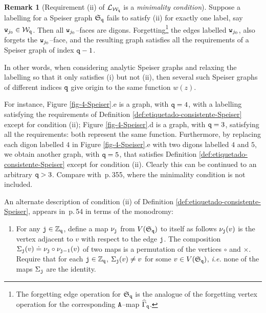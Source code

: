 \documentclass[final,3p,times]{elsarticle}
\newcommand{\ZZ}{\ensuremath{{\mathbb Z}}}
\theoremstyle{definition}
\newtheorem{remark}[theorem]{Remark}
\begin{document}
\begin{remark}[Requirement (ii) of $\mathcal{L}_{\mathcal{W}_{\tt q}}$ 
is a \emph{minimality condition}]
\label{rem:minimality-condition}
Suppose a labelling for a Speiser graph $\mathfrak{S}_{\tt q}$ fails to
satisfy (ii) 
for exactly one label, say ${\tt w}_{j_0}\in\mathcal{W}_{\tt q}$. 
Then all  
${\tt w}_{j_0}$--faces are digons.
Forgetting\footnote{
The forgetting edge operation for $\mathfrak{S}_{\tt q}$ is the analogue of the forgetting vertex operation
for the corresponding $\tt A$--map $\widehat{\Gamma}_{\tt q}$.
} 
the edges labelled ${\tt w}_{j_0}$, also forgets the 
${\tt w}_{j_0}$--face, and the resulting graph satisfies all the requirements of a Speiser graph
of index ${\tt q}-1$.

\noindent
In other words, when considering analytic Speiser graphs and relaxing the labelling 
so that it only satisfies (i) but not (ii), then several such Speiser graphs of 
different indices $\tt q$
give origin to the same function $w(z)$. 

\noindent
For instance, Figure \ref{fig-4-Speiser}.e is a graph, with ${\tt q}=4$, with a labelling 
satisfying the requirements of 
Definition \ref{def:etiquetado-consistente-Speiser} except for condition (ii); 
Figure \ref{fig-4-Speiser}.d is a graph, with ${\tt q}=3$, satisfying all the requirements: 
both represent the same
function. Furthermore, by replacing each digon labelled $4$ in Figure \ref{fig-4-Speiser}.e
with two digons labelled $4$ and $5$, we obtain another graph, with ${\tt q}=5$, that satisfies 
Definition \ref{def:etiquetado-consistente-Speiser} except for condition (ii).
Clearly this can be continued to an arbitrary ${\tt q}>3$.
Compare with \cite{GoldbergOstrovskii}\,p.\,355, where 
the minimality condition is not included.

\smallskip
\noindent
An alternate description of condition (ii) of Definition \ref{def:etiquetado-consistente-Speiser},
appears in \cite{Masoero}\,p.\,54 in terms of the monodromy:

\smallskip 

\begin{enumerate}[label=ii$^\prime$),leftmargin=*]
\item
For any ${\tt j}\in\ZZ_{\tt q}$,  define a map 
$\nu_{\tt j}$
from 
$V(\mathfrak{S}_{\tt q})$ to itself as follows
$\nu_{\tt j}(v)$ is the vertex adjacent to $v$ 
with respect to the edge ${\tt j}$. 
The composition $\Sigma_{\tt j}(v)\doteq \nu_{\tt j} \circ \nu_{{\tt j}-1}(v)$ of
two maps is a permutation of the vertices $\circ$ and $\times$. 
Require that for each ${\tt j}\in\ZZ_{\tt q}$, $\Sigma_{\tt j}(v)\not = v$ for some $v\in V(\mathfrak{S}_{\tt q})$,
{\it i.e.} none of the maps $\Sigma_{\tt j}$ are the identity.
\end{enumerate}
\end{remark}
\end{document}

